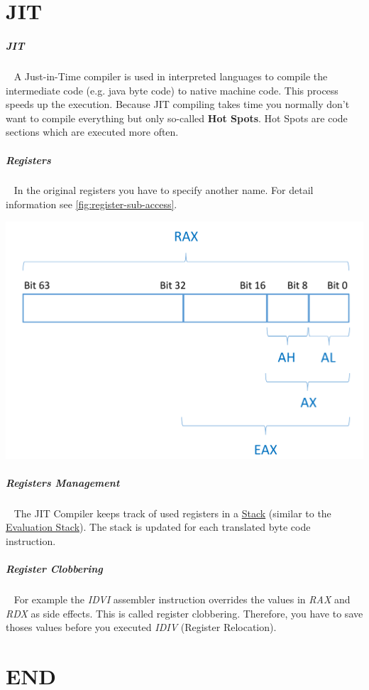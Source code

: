\documentclass[11pt,twoside,landscape]{article}
\begin{document}
\begin{multicols}{3}
\section{JIT}
\label{sec:org2066497}
\subparagraph{JIT} \
\label{sec:orgdfe75fb}
A Just-in-Time compiler is used in interpreted languages to compile the intermediate code (e.g. java byte code) to native machine code.
This process speeds up the execution.
Because JIT compiling takes time you normally don't want to compile everything but only so-called \textbf{Hot Spots}.
Hot Spots are code sections which are executed more often.

\subparagraph{Registers} \
\label{sec:orge669fd4}
In the original registers you have to specify another name.
For detail information see \autoref{fig:register-sub-access}.


{
\begin{center}
\includegraphics[width=.9\linewidth]{img/register_subaccess.png}
\end{center}
\captionof{figure}{Register sub access}\label{fig:register-sub-access}
}
\subparagraph{Registers Management} \
\label{sec:org4987dd4}
The JIT Compiler keeps track of used registers in a \href{../../../roam/20210806220134-stack.org}{Stack} (similar to the \href{../../../roam/20221230171752-what_is_a_evaluation_stack.org}{Evaluation Stack}).
The stack is updated for each translated byte code instruction.
\subparagraph{Register Clobbering} \
\label{sec:org80eb31b}
For example the \emph{IDVI} assembler instruction overrides the values in \emph{RAX} and \emph{RDX} as side effects.
This is called register clobbering.
Therefore, you have to save thoses values before you executed \emph{IDIV} (Register Relocation).

\section{END}
\label{sec:org2ce2fd7}
\end{multicols}
\end{document}
